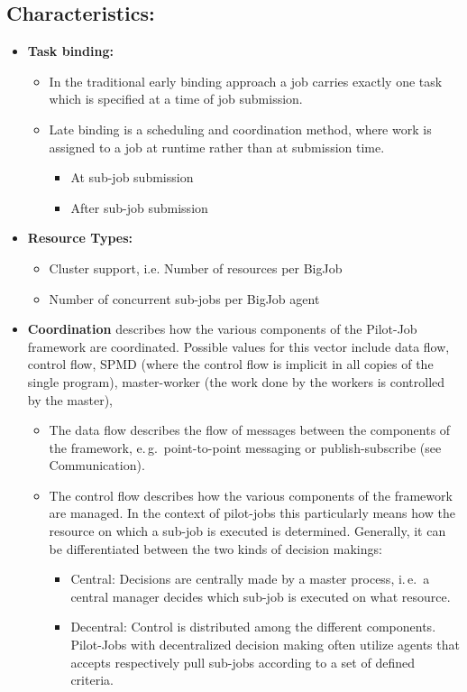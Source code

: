 \documentclass[]{article}
\begin{document}
\subsection{Characteristics:}
\begin{itemize}
	\item \textbf{Task binding:~\cite{}} 
		\begin{itemize}
			\item In the traditional early binding approach a job carries
			 exactly one task which is specified at a time of job submission.
			\item Late binding is a scheduling and coordination
			 method, where work is assigned to a job at runtime rather than at
			 submission time.
			\begin{itemize}
				\item At sub-job submission 
				\item After sub-job submission
			\end{itemize}
		\end{itemize} 
	\item \textbf{Resource Types:}
	\begin{itemize}
		\item Cluster support, i.e. Number of resources per BigJob
		\item Number of concurrent sub-jobs per BigJob agent
	\end{itemize}
	\item \textbf{Coordination} describes how the various components of 
	the Pilot-Job framework are	coordinated. Possible values for this vector include data
	flow, control flow, SPMD (where the control flow is implicit in all copies of the single program), master-worker
	(the work done by the workers is controlled by the master),
	\begin{itemize}
		\item The data flow describes the flow of messages between the components of the framework, e.\,g.\ point-to-point messaging or publish-subscribe (see Communication).
		\item The control flow describes how the various components of the
		 framework are managed. In the context of pilot-jobs this particularly means how the resource on which a sub-job is executed is determined. Generally, it can be differentiated between the two kinds of decision makings:
			\begin{itemize}
				\item Central: Decisions are centrally made by a master
				 process, i.\,e.\ a central manager decides which sub-job is
				 executed on what resource.
				\item Decentral: Control is distributed among the 
				different components. Pilot-Jobs with decentralized decision 
				making often utilize agents that accepts respectively pull 
				sub-jobs according to a set of defined criteria.
			\end{itemize}
			

\end{itemize}
\end{itemize}
\end{document}
